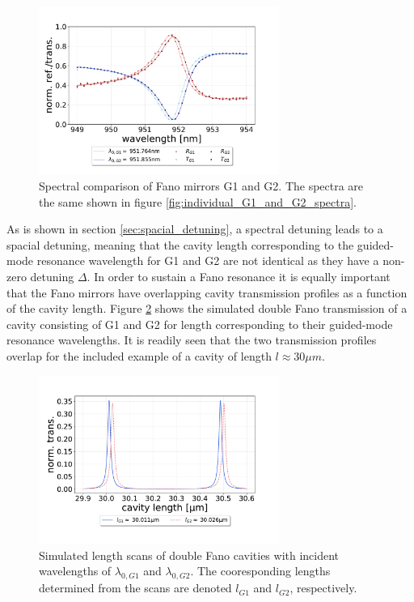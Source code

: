 \begin{figure}[h!]
    \centering
    \includegraphics[width=0.7\textwidth]{figures/results/M3:M5/M3:M5_initial_spectra.pdf}
    \caption{Spectral comparison of Fano mirrors G1 and G2. The spectra are the same shown in figure \ref{fig:individual_G1_and_G2_spectra}.}
    \label{fig:G1_and_G2_spectral_comparison}
\end{figure}

As is shown in section \ref{sec:spacial_detuning}, a spectral detuning leads to a spacial detuning, meaning that the cavity length corresponding to the guided-mode resonance wavelength for G1 and G2 are not identical as they have a non-zero detuning $\Delta$. In order to sustain a Fano resonance it is equally important that the Fano mirrors have overlapping cavity transmission profiles as a function of the cavity length. Figure \ref{fig:G1/G2_length_scan} shows the simulated double Fano transmission of a cavity consisting of G1 and G2 for length corresponding to their guided-mode resonance wavelengths. It is readily seen that the two transmission profiles overlap for the included example of a cavity of length $l \approx 30 \mu m$.

\begin{figure}[h!]
    \centering
    \includegraphics[width=0.7\textwidth]{figures/results/M3:M5_length_scan_sim_30um.pdf}
    \caption{Simulated length scans of double Fano cavities with incident wavelengths of $\lambda_{0,G1}$ and $\lambda_{0,G2}$. The cooresponding lengths determined from the scans are denoted $l_{G1}$ and $l_{G2}$, respectively.}
    \label{fig:G1/G2_length_scan}
\end{figure}


